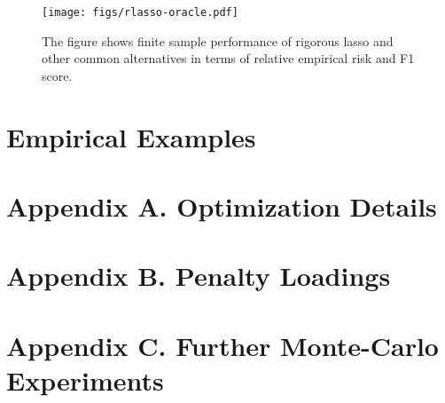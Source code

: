 \documentclass[11pt, reqno]{amsart} \usepackage{pstricks} %
\begin{document}
\begin{figure}[h]
  \centering
  \texttt{[image: figs/rlasso-oracle.pdf]}
  \caption{The figure shows finite sample performance of rigorous lasso and
    other common alternatives in terms of relative empirical risk and F1 score.}
  \label{fig:rlasso-performance}
\end{figure}


\section{Empirical Examples}

\section*{Appendix A. Optimization Details}

\section*{Appendix B. Penalty Loadings}

\section*{Appendix C. Further Monte-Carlo Experiments}



\end{document}
